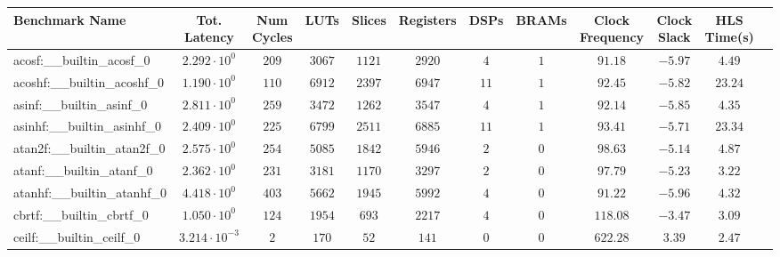 \begin{tabular}{|l|c|c|c|c|c|c|c|c|c|c|c|}
\hline
Benchmark Name                            & Tot. Latency            & Num Cycles & LUTs       & Slices    & Registers  & DSPs    & BRAMs & Clock Frequency & Clock Slack & HLS Time(s) \\
\hline
acosf:\_\_builtin\_acosf\_0               & $ 2.292 \cdot 10^{0}  $ & $ 209    $ & $ 3067   $ & $ 1121  $ & $ 2920   $ & $ 4   $ & $ 1 $ & $ 91.18       $ & $ -5.97   $ & $ 4.49    $ \\
acoshf:\_\_builtin\_acoshf\_0             & $ 1.190 \cdot 10^{0}  $ & $ 110    $ & $ 6912   $ & $ 2397  $ & $ 6947   $ & $ 11  $ & $ 1 $ & $ 92.45       $ & $ -5.82   $ & $ 23.24   $ \\
asinf:\_\_builtin\_asinf\_0               & $ 2.811 \cdot 10^{0}  $ & $ 259    $ & $ 3472   $ & $ 1262  $ & $ 3547   $ & $ 4   $ & $ 1 $ & $ 92.14       $ & $ -5.85   $ & $ 4.35    $ \\
asinhf:\_\_builtin\_asinhf\_0             & $ 2.409 \cdot 10^{0}  $ & $ 225    $ & $ 6799   $ & $ 2511  $ & $ 6885   $ & $ 11  $ & $ 1 $ & $ 93.41       $ & $ -5.71   $ & $ 23.34   $ \\
atan2f:\_\_builtin\_atan2f\_0             & $ 2.575 \cdot 10^{0}  $ & $ 254    $ & $ 5085   $ & $ 1842  $ & $ 5946   $ & $ 2   $ & $ 0 $ & $ 98.63       $ & $ -5.14   $ & $ 4.87    $ \\
atanf:\_\_builtin\_atanf\_0               & $ 2.362 \cdot 10^{0}  $ & $ 231    $ & $ 3181   $ & $ 1170  $ & $ 3297   $ & $ 2   $ & $ 0 $ & $ 97.79       $ & $ -5.23   $ & $ 3.22    $ \\
atanhf:\_\_builtin\_atanhf\_0             & $ 4.418 \cdot 10^{0}  $ & $ 403    $ & $ 5662   $ & $ 1945  $ & $ 5992   $ & $ 4   $ & $ 0 $ & $ 91.22       $ & $ -5.96   $ & $ 4.32    $ \\
cbrtf:\_\_builtin\_cbrtf\_0               & $ 1.050 \cdot 10^{0}  $ & $ 124    $ & $ 1954   $ & $ 693   $ & $ 2217   $ & $ 4   $ & $ 0 $ & $ 118.08      $ & $ -3.47   $ & $ 3.09    $ \\
ceilf:\_\_builtin\_ceilf\_0               & $ 3.214 \cdot 10^{-3} $ & $ 2      $ & $ 170    $ & $ 52    $ & $ 141    $ & $ 0   $ & $ 0 $ & $ 622.28      $ & $ 3.39    $ & $ 2.47    $ \\

\end{tabular}
